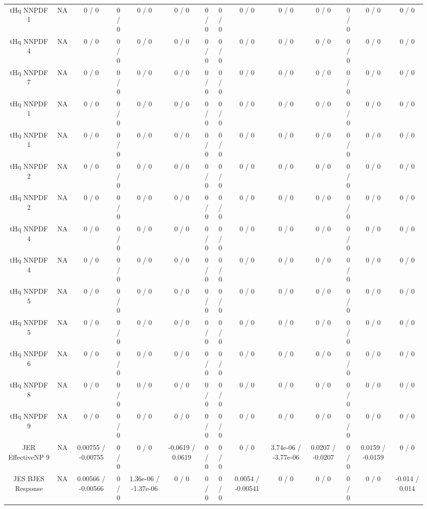 \documentclass[10pt]{article}
\begin{document}
\begin{table}[htbp]
\begin{center}
\begin{tabular}{|c|c|c|c|c|c|c|c|c|c|c|c|c|c|}
  tHq NNPDF 1 &    NA    & 0 / 0 & 0 / 0 & 0 / 0 & 0 / 0 & 0 / 0 & 0 / 0 & 0 / 0 & 0 / 0 & 0 / 0 & 0 / 0 & 0 / 0 & 0 / 0 \\ 
  tHq NNPDF 4 &    NA    & 0 / 0 & 0 / 0 & 0 / 0 & 0 / 0 & 0 / 0 & 0 / 0 & 0 / 0 & 0 / 0 & 0 / 0 & 0 / 0 & 0 / 0 & 0 / 0 \\ 
  tHq NNPDF 7 &    NA    & 0 / 0 & 0 / 0 & 0 / 0 & 0 / 0 & 0 / 0 & 0 / 0 & 0 / 0 & 0 / 0 & 0 / 0 & 0 / 0 & 0 / 0 & 0 / 0 \\ 
  tHq NNPDF 1 &    NA    & 0 / 0 & 0 / 0 & 0 / 0 & 0 / 0 & 0 / 0 & 0 / 0 & 0 / 0 & 0 / 0 & 0 / 0 & 0 / 0 & 0 / 0 & 0 / 0 \\ 
  tHq NNPDF 1 &    NA    & 0 / 0 & 0 / 0 & 0 / 0 & 0 / 0 & 0 / 0 & 0 / 0 & 0 / 0 & 0 / 0 & 0 / 0 & 0 / 0 & 0 / 0 & 0 / 0 \\ 
  tHq NNPDF 2 &    NA    & 0 / 0 & 0 / 0 & 0 / 0 & 0 / 0 & 0 / 0 & 0 / 0 & 0 / 0 & 0 / 0 & 0 / 0 & 0 / 0 & 0 / 0 & 0 / 0 \\ 
  tHq NNPDF 2 &    NA    & 0 / 0 & 0 / 0 & 0 / 0 & 0 / 0 & 0 / 0 & 0 / 0 & 0 / 0 & 0 / 0 & 0 / 0 & 0 / 0 & 0 / 0 & 0 / 0 \\ 
  tHq NNPDF 4 &    NA    & 0 / 0 & 0 / 0 & 0 / 0 & 0 / 0 & 0 / 0 & 0 / 0 & 0 / 0 & 0 / 0 & 0 / 0 & 0 / 0 & 0 / 0 & 0 / 0 \\ 
  tHq NNPDF 4 &    NA    & 0 / 0 & 0 / 0 & 0 / 0 & 0 / 0 & 0 / 0 & 0 / 0 & 0 / 0 & 0 / 0 & 0 / 0 & 0 / 0 & 0 / 0 & 0 / 0 \\ 
  tHq NNPDF 5 &    NA    & 0 / 0 & 0 / 0 & 0 / 0 & 0 / 0 & 0 / 0 & 0 / 0 & 0 / 0 & 0 / 0 & 0 / 0 & 0 / 0 & 0 / 0 & 0 / 0 \\ 
  tHq NNPDF 5 &    NA    & 0 / 0 & 0 / 0 & 0 / 0 & 0 / 0 & 0 / 0 & 0 / 0 & 0 / 0 & 0 / 0 & 0 / 0 & 0 / 0 & 0 / 0 & 0 / 0 \\ 
  tHq NNPDF 6 &    NA    & 0 / 0 & 0 / 0 & 0 / 0 & 0 / 0 & 0 / 0 & 0 / 0 & 0 / 0 & 0 / 0 & 0 / 0 & 0 / 0 & 0 / 0 & 0 / 0 \\ 
  tHq NNPDF 8 &    NA    & 0 / 0 & 0 / 0 & 0 / 0 & 0 / 0 & 0 / 0 & 0 / 0 & 0 / 0 & 0 / 0 & 0 / 0 & 0 / 0 & 0 / 0 & 0 / 0 \\ 
  tHq NNPDF 9 &    NA    & 0 / 0 & 0 / 0 & 0 / 0 & 0 / 0 & 0 / 0 & 0 / 0 & 0 / 0 & 0 / 0 & 0 / 0 & 0 / 0 & 0 / 0 & 0 / 0 \\ 
  JER EffectiveNP 9 &    NA    & 0.00755 / -0.00755 & 0 / 0 & 0 / 0 & -0.0619 / 0.0619 & 0 / 0 & 0 / 0 & 0 / 0 & 3.74e-06 / -3.77e-06 & 0.0207 / -0.0207 & 0 / 0 & 0.0159 / -0.0159 & 0 / 0 \\ 
  JES BJES Response &    NA    & 0.00566 / -0.00566 & 0 / 0 & 1.36e-06 / -1.37e-06 & 0 / 0 & 0 / 0 & 0 / 0 & 0.0054 / -0.00541 & 0 / 0 & 0 / 0 & 0 / 0 & 0 / 0 & -0.014 / 0.014 \\ 

\end{tabular}
\end{center}
\end{table}
\end{document}
